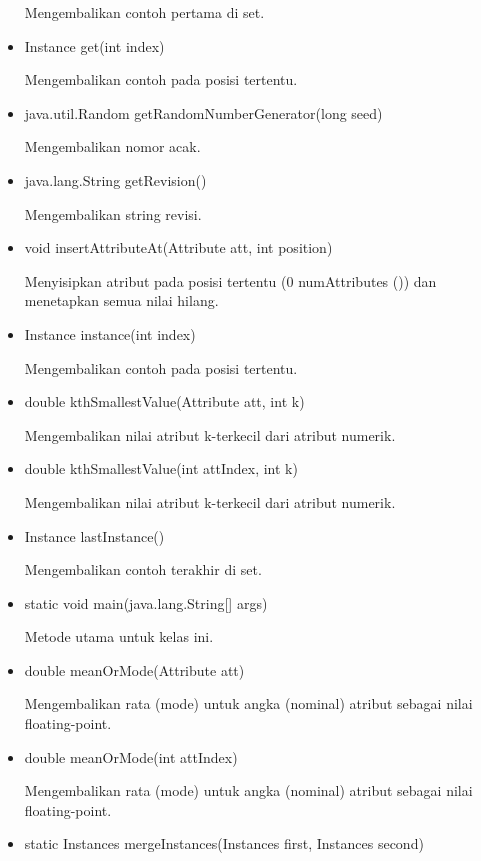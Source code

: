\begin{itemize}
	Mengembalikan contoh pertama di set.
	
	\item Instance get(int index)
	
	Mengembalikan contoh pada posisi tertentu.
	
	\item java.util.Random getRandomNumberGenerator(long seed)
	
	Mengembalikan nomor acak.
	
	\item java.lang.String getRevision()
	
	Mengembalikan string revisi.
	
	\item void insertAttributeAt(Attribute att, int position)
	
	Menyisipkan atribut pada posisi tertentu (0 numAttributes ()) dan menetapkan semua nilai hilang.
	
	\item Instance instance(int index)
	
	Mengembalikan contoh pada posisi tertentu.
	
	\item double kthSmallestValue(Attribute att, int k)
	
	Mengembalikan nilai atribut k-terkecil dari atribut numerik.
	
	\item double kthSmallestValue(int attIndex, int k)
	
	Mengembalikan nilai atribut k-terkecil dari atribut numerik.
	
	\item Instance lastInstance()
	
	Mengembalikan contoh terakhir di set.
	
	\item static void main(java.lang.String[] args)
	
	Metode utama untuk kelas ini.
	
	\item double meanOrMode(Attribute att)
	
	Mengembalikan rata (mode) untuk angka (nominal) atribut sebagai nilai floating-point.
	
	\item double meanOrMode(int attIndex)
	
	Mengembalikan rata (mode) untuk angka (nominal) atribut sebagai nilai floating-point.
	
	\item static Instances mergeInstances(Instances first, Instances second)
	

\end{itemize}
